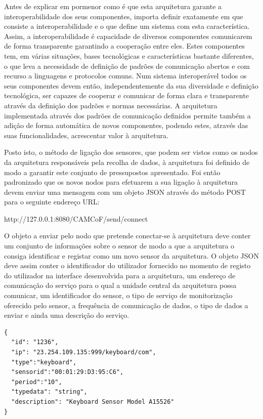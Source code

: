 Antes de explicar em pormenor como é que esta arquitetura garante a interoperabilidade dos seus componentes, importa definir exatamente em que consiste a interoperabilidade e o que define um sistema com esta característica. Assim, a interoperabilidade é capacidade de diversos componentes comunicarem de forma transparente garantindo a cooperação entre eles. Estes componentes tem, em várias situações, bases tecnológicas e características bastante diferentes, o que leva a necessidade de definição de padrões de comunicação abertos e com recurso a linguagens e protocolos comuns\cite{jammes2005service, song2009service}. Num sistema interoperável todos os seus componentes devem então, independentemente da sua diversidade e definição tecnológica, ser capazes de cooperar e comunicar de forma clara e transparente através da definição dos padrões e normas necessárias. A arquitetura implementada através dos padrões de comunicação definidos permite também a adição de forma automática de novos componentes, podendo estes, através das suas funcionalidades, acrescentar valor à arquitetura.

Posto isto, o método de ligação dos sensores, que podem ser vistos como os nodos da arquitetura responsáveis pela recolha de dados, à arquitetura foi definido de modo a garantir este conjunto de pressupostos apresentado. Foi então padronizado que os novos nodos para efetuarem a sua ligação à arquitetura devem enviar uma mensagem com um objeto JSON através do método POST para o seguinte endereço URL:

http://127.0.0.1:8080/CAMCoF/send/connect

O objeto a enviar pelo nodo que pretende conectar-se à arquitetura deve conter um conjunto de informações sobre o sensor de modo a que a arquitetura o consiga identificar e registar como um novo sensor da arquitetura. O objeto JSON deve assim conter o identificador do utilizador fornecido no momento de registo do utilizador na interface desenvolvida para a arquitetura, um endereço de comunicação do serviço para o qual a unidade central da arquitetura possa comunicar, um identificador do sensor, o tipo de serviço de monitorização oferecido pelo sensor, a frequência de comunicação de dados, o tipo de dados a enviar e ainda uma descrição do serviço.

\begin{lstlisting}[caption=Exemplo de objeto JSON enviado por Sensor de Teclado]
{
  "id": "1236",
  "ip": "23.254.109.135:999/keyboard/com",
  "type":"keyboard",
  "sensorid":"00:01:29:D3:95:C6",
  "period":"10",
  "typedata": "string",
  "description": "Keyboard Sensor Model A15526"
}
\end{lstlisting}

